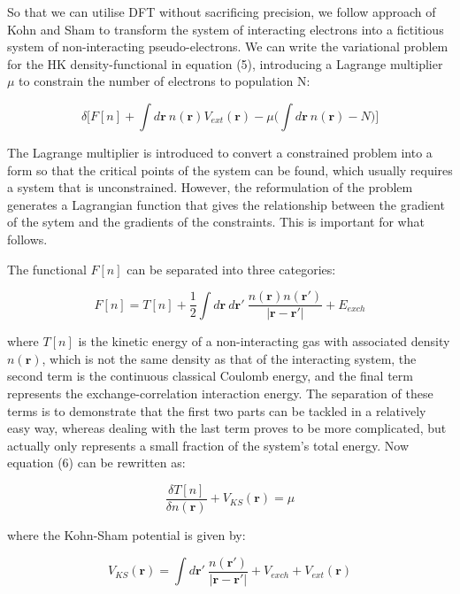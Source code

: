 \documentclass[10pt]{article}
\begin{document}
So that we can utilise DFT without sacrificing precision, we follow approach of Kohn and Sham \cite{kohn1965self} to transform the system of interacting electrons into a fictitious system of non-interacting pseudo-electrons. We can write the variational problem for the HK density-functional in equation (5), introducing a Lagrange multiplier $\mu$ to constrain the number of electrons to population N:

\begin{equation}
	\delta\biggr[F[n]+\int d\mathbf{r} \ n(\mathbf{r})V_{ext}(\mathbf{r}) - \mu\biggr(\int d\mathbf{r} \ n(\mathbf{r}) - N\biggr)\biggr]
\end{equation}

The Lagrange multiplier is introduced to convert a constrained problem into a form so that the critical points of the system can be found, which usually requires a system that is unconstrained. However, the reformulation of the problem generates a Lagrangian function that gives the relationship between the gradient of the sytem and the gradients of the constraints. This is important for what follows.

The functional $F[n]$ can be separated into three categories:

\begin{equation*}
	F[n] = T[n]+\frac{1}{2}\int d\mathbf{r} \ d\mathbf{r}' \ \frac{n(\mathbf{r})n(\mathbf{r}')}{|\mathbf{r}-\mathbf{r}'|}+E_{exch}
\end{equation*}

where $T[n]$ is the kinetic energy of a non-interacting gas with associated density $n(\mathbf{r})$, which is not the same density as that of the interacting system, the second term is the continuous classical Coulomb energy, and the final term represents the exchange-correlation interaction energy. The separation of these terms is to demonstrate that the first two parts can be tackled in a relatively easy way, whereas dealing with the last term proves to be more complicated, but actually only represents a small fraction of the system's total energy. Now equation (6) can be rewritten as:

\begin{equation}
	\frac{\delta T[n]}{\delta n(\mathbf{r})} + V_{KS}(\mathbf{r}) = \mu
\end{equation}

where the Kohn-Sham potential is given by:

\begin{equation*}
	V_{KS}(\mathbf{r}) = \int d\mathbf{r}' \ \frac{n(\mathbf{r}')}{|\mathbf{r}-\mathbf{r}'|}+V_{exch}+V_{ext}(\mathbf{r})
\end{equation*}
\end{document}
